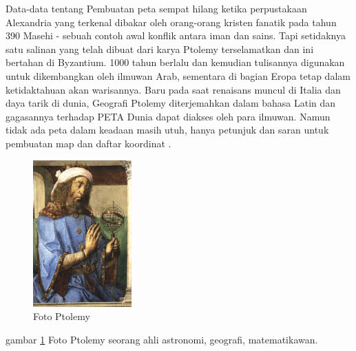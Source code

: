 	Data-data tentang Pembuatan peta sempat hilang ketika perpustakaan Alexandria yang terkenal dibakar oleh orang-orang kristen fanatik pada tahun 390 Masehi - sebuah contoh awal konflik antara iman dan sains. Tapi setidaknya satu salinan yang telah dibuat dari karya Ptolemy terselamatkan dan ini bertahan di Byzantium. 1000 tahun berlalu dan kemudian tulisannya digunakan untuk dikembangkan oleh ilmuwan Arab, sementara di bagian Eropa tetap dalam ketidaktahuan akan warisannya. Baru pada saat renaisans muncul di Italia dan daya tarik di dunia, Geografi Ptolemy diterjemahkan dalam bahasa Latin dan gagasannya terhadap PETA Dunia dapat diakses oleh para ilmuwan.
	Namun tidak ada peta dalam keadaan masih utuh, hanya petunjuk dan saran untuk pembuatan map dan daftar koordinat \cite{smart2005maps}.
	\begin{figure} [ht]
	\centerline{\includegraphics[width=.5\textwidth]{figures/ptolemy}}
	\caption{Foto Ptolemy}
	\label{ptolemy}
	\end{figure}
	gambar \ref{ptolemy} Foto Ptolemy seorang ahli astronomi, geografi, matematikawan.

